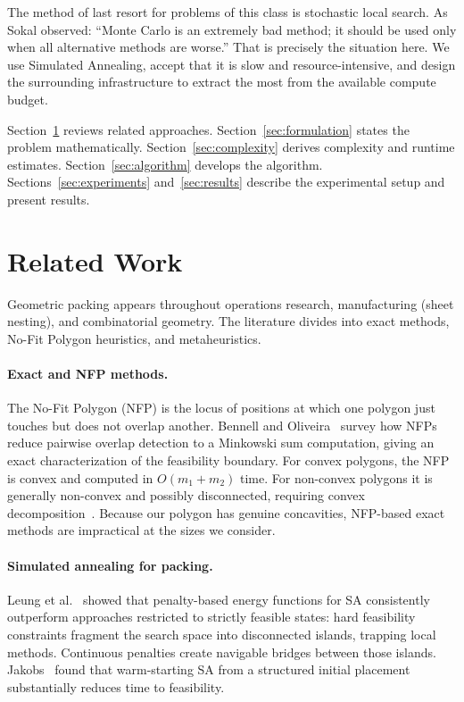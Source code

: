 \documentclass[10pt,twocolumn]{article}
\begin{document}
The method of last resort for problems of this class is stochastic
local search. As Sokal observed: ``Monte Carlo is an extremely bad
method; it should be used only when all alternative methods are
worse.'' That is precisely the situation here. We use Simulated
Annealing, accept that it is slow and resource-intensive, and design
the surrounding infrastructure to extract the most from the available
compute budget.

Section~\ref{sec:related} reviews related approaches.
Section~\ref{sec:formulation} states the problem mathematically.
Section~\ref{sec:complexity} derives complexity and runtime estimates.
Section~\ref{sec:algorithm} develops the algorithm.
Sections~\ref{sec:experiments} and~\ref{sec:results} describe the
experimental setup and present results.

\section{Related Work}
\label{sec:related}

Geometric packing appears throughout operations research, manufacturing
(sheet nesting), and combinatorial geometry. The literature divides
into exact methods, No-Fit Polygon heuristics, and metaheuristics.

\paragraph{Exact and NFP methods.}
The No-Fit Polygon (NFP) is the locus of positions at which one
polygon just touches but does not overlap another.
Bennell and Oliveira~\cite{bennell2008} survey how NFPs reduce
pairwise overlap detection to a Minkowski sum computation, giving an
exact characterization of the feasibility boundary. For convex polygons,
the NFP is convex and computed in $O(m_1 + m_2)$ time. For non-convex
polygons it is generally non-convex and possibly disconnected, requiring
convex decomposition~\cite{ghosh1993}. Because our polygon has genuine
concavities, NFP-based exact methods are impractical at the sizes
we consider.

\paragraph{Simulated annealing for packing.}
Leung et al.~\cite{leung2003} showed that penalty-based energy
functions for SA consistently outperform approaches restricted to
strictly feasible states: hard feasibility constraints fragment the
search space into disconnected islands, trapping local methods.
Continuous penalties create navigable bridges between those islands.
Jakobs~\cite{jakobs1996} found that warm-starting SA from a structured
initial placement substantially reduces time to feasibility.
\end{document}
